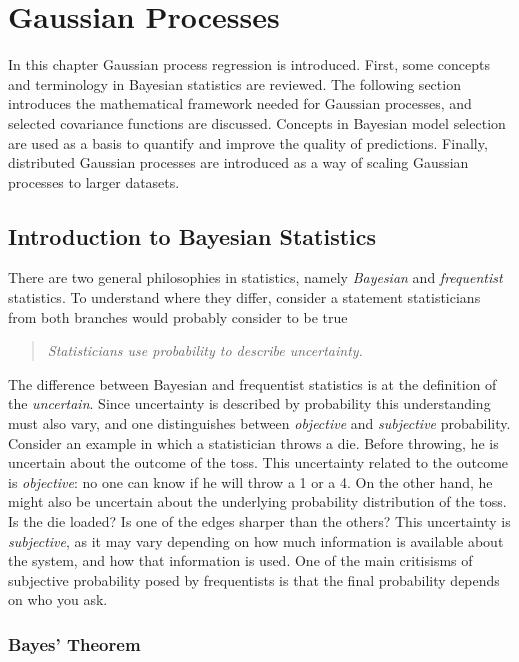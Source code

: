 \documentclass[twoside,english]{uiofysmaster}
\begin{document}
\tableofcontents



\chapter{Gaussian Processes}

In this chapter Gaussian process regression is introduced. First, some concepts and terminology in Bayesian statistics are reviewed. The following section introduces the mathematical framework needed for Gaussian processes, and selected covariance functions are discussed. Concepts in Bayesian model selection are used as a basis to quantify and improve the quality of predictions. Finally, distributed Gaussian processes are introduced as a way of scaling Gaussian processes to larger datasets.

\section{Introduction to Bayesian Statistics}

There are two general philosophies in statistics, namely \textit{Bayesian} and \textit{frequentist} statistics. To understand where they differ, consider a statement statisticians from both branches would probably consider to be true
\begin{quote}
\textit{Statisticians use probability to describe uncertainty.}
\end{quote}
The difference between Bayesian and frequentist statistics is at the definition of the \textit{uncertain}. Since uncertainty is described by probability this understanding must also vary, and one distinguishes between \textit{objective} and \textit{subjective} probability. Consider an example in which a statistician throws a die. Before throwing, he is uncertain about the outcome of the toss. This uncertainty related to the outcome is \textit{objective}: no one can know if he will throw a 1 or a 4. On the other hand, he might also be uncertain about the underlying probability distribution of the toss. Is the die loaded? Is one of the edges sharper than the others? This uncertainty is \textit{subjective}, as it may vary depending on how much information is available about the system, and how that information is used. One of the main critisisms of subjective probability posed by frequentists is that the final probability depends on who you ask.

\subsection{Bayes' Theorem}
\end{document}
